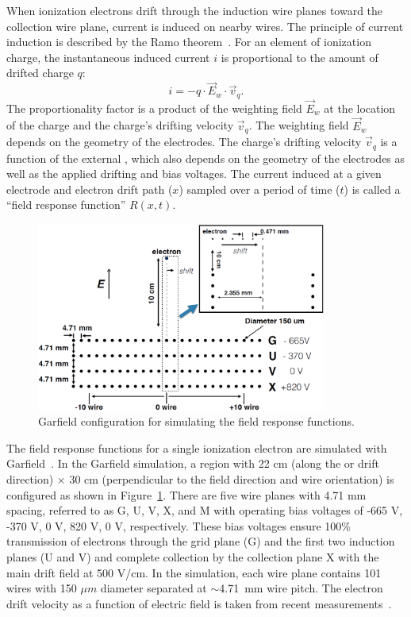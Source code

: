 When ionization electrons drift through the induction wire planes toward the collection wire plane, current is
induced on nearby wires. The principle of current induction is described by the Ramo theorem~\cite{Shockley1938,Ramo:1939vr}. 
For an element of ionization charge, the instantaneous induced current $i$ is proportional to the amount of drifted charge $q$: 
\begin{equation}\label{eq:shockley_ramo}
  i = - q \cdot \vec{E}_w \cdot \vec{v}_q.
\end{equation}
The proportionality factor is a product of the weighting field $\vec{E}_w$ at the location of the charge and 
the charge's drifting velocity $\vec{v}_q$. The weighting field $\vec{E}_w$ depends on the geometry of 
the electrodes. The charge's drifting velocity $\vec{v}_q$ is a function of the external \efield, which 
also depends on the geometry of the electrodes as well as the applied drifting and bias voltages. The current induced at a given electrode and electron drift path ($x$)
  sampled over a period of time ($t$) is called a ``field response function'' $R(x,t)$.

\begin{figure}[!htp]
\centering
\includegraphics[width=0.85\textwidth]{graphics/apa_cell.png}
\caption[Garfield configuration for simulating the field response functions]{Garfield configuration for simulating the field response functions.}
\label{field_resp_geometry}
\end{figure}

The field response functions for a single ionization electron are simulated with Garfield~\cite{garfield}.  
In the Garfield simulation, a region with 22 cm (along the \efield or drift direction) $\times$ 
30 cm (perpendicular to the field direction and wire orientation) is configured as shown in 
Figure~\ref{field_resp_geometry}. There are five wire planes with 4.71 mm spacing, referred to as G, U, V, X, and 
M with operating bias voltages of -665 V, -370 V, 0 V, 820 V, 0 V, respectively.  
These bias voltages ensure 100\% transmission of electrons through the grid plane (G) and the 
first two induction planes (U and V) and complete collection by the collection plane X with the main drift 
field at 500 V/cm. In the simulation, each wire plane contains 101 wires with 150 $\mu m$ diameter
  separated at $\sim$\SI{4.71}{\mm} wire pitch. The electron drift velocity as a function of electric
  field is taken from recent measurements~\cite{Li:2015rqa,ref:lar_property}. 

